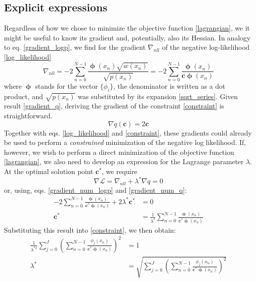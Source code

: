 \documentclass[]{report}
\begin{document}
		\subsection{Explicit expressions}
		Regardless of how we chose to minimize the objective function \ref{lagrangian}, we it might be useful to know its gradient and, potentially, also its Hessian. In analogy to eq. \ref{gradient_logp}, we find for the gradient $\nabla_{nll}$ of the negative log-likelihood \ref{log_likelihood}
		\begin{equation}\label{gradient_num_logp}
			\nabla_{nll} = -2\sum_{n=0}^{N-1}\frac{\bm{\upphi}(x_n)\sqrt{w(x_n)}}{\sqrt{p(x_n)}} = -2\sum_{n=0}^{N-1}\frac{\bm{\upphi}(x_n)}{\mathbf{c}\bm{\upphi}(x_n)}
		\end{equation}
		where $\bm{\upphi}$ stands for the vector $\{\phi_i\}$, the denominator is written as a dot product, and $\sqrt{p(x_n)}$ was substituted by its expansion \ref{sqrt_series}. Given result \ref{gradient_q}, deriving the gradient of the constraint \ref{constraint} is straightforward.
		\begin{equation}\label{gradient_num_q}
			\nabla q(\mathbf{c}) = 2\mathbf{c}
		\end{equation}
		Together with eqs. \ref{log_likelihood} and \ref{constraint}, these gradients could already be used to perform a \emph{constrained} minimization of the negative log likelihood. If, however, we wish to perform a direct minimization of the objective function \ref{lagrangian}, we also need to develop an expression for the Lagrange parameter $\lambda$. At the optimal solution point $\mathbf{c}^*$, we require
		\begin{equation*}
			\nabla\mathcal{L} = \nabla_{nll} + \lambda^*\nabla q = 0
		\end{equation*}
		or, using, eqs. \ref{gradient_num_logp} and \ref{gradient_num_q}:
		\begin{align}
			-2\sum_{n=0}^{N-1}\frac{\bm{\upphi}(x_n)}{\mathbf{c}^*\bm{\upphi}(x_n)} + 2\lambda^*\mathbf{c}^* & = 0 \nonumber \\
			\mathbf{c}^* & = \frac{1}{\lambda^*}\sum_{n=0}^{N-1}\frac{\bm{\upphi}(x_n)}{\mathbf{c}^*\bm{\upphi}(x_n)}
		\end{align}
		Substituting this result into \ref{constraint}, we then obtain:
		\begin{align}\label{lambda}
			\frac{1}{\lambda^{*2}}\sum_{j=0}^{J}\left(\sum_{n=0}^{N-1}\frac{\phi_j(x_n)}{\mathbf{c}^*\bm{\upphi}(x_n)}\right)^2 & = 1 \nonumber \\
			\lambda^* & = \sqrt{\sum_{j=0}^{J}\left(\sum_{n=0}^{N-1}\frac{\phi_j(x_n)}{\mathbf{c}^*\bm{\upphi}(x_n)}\right)^2}
		\end{align}
\end{document}
